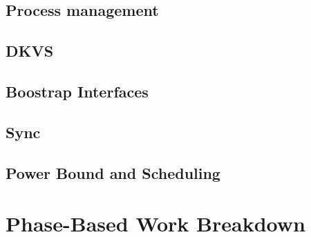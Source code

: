 \documentclass[10pt]{article}
\begin{document}
\subsection{Process management}

\subsection{DKVS}

\subsection{Boostrap Interfaces}

\subsection{Sync}

\subsection{Power Bound and Scheduling}

\section{Phase-Based Work Breakdown}



\end{document}
